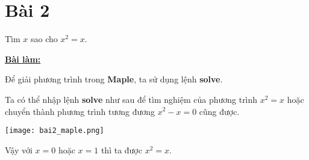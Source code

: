 \section*{Bài 2}

Tìm $x$ sao cho $x^2 = x$.
	

\begin{center}
    \textbf{\underline{Bài làm:}}
\end{center}

Để giải phương trình trong \textbf{Maple}, ta sử dụng lệnh \textbf{solve}.

Ta có thể nhập lệnh \textbf{solve} như sau để tìm nghiệm của phương trình $x^2 = x$ hoặc chuyển thành phương trình tương đương $x^2 - x = 0$ cũng được.

\texttt{[image: bai2\_maple.png]}

Vậy với $x = 0$ hoặc $x = 1$ thì ta được $x^2 = x$.
	
\clearpage